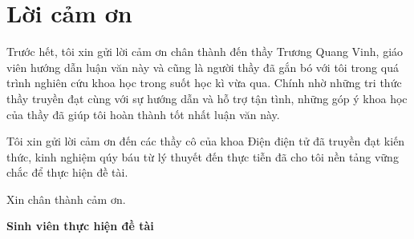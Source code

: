 \chapter*{Lời cảm ơn}
Trước hết, tôi xin gửi lời cảm ơn chân thành đến thầy Trương Quang Vinh,
giáo viên hướng dẫn luận văn này và cũng là người thầy đã gắn bó với tôi trong quá trình nghiên cứu khoa học trong suốt học kì vừa qua.
Chính nhờ những tri thức thầy truyền đạt cùng với sự hướng dẫn và hỗ trợ tận tình, những góp ý khoa học của thầy đã giúp tôi hoàn thành tốt nhất luận văn này.

Tôi xin gửi lời cảm ơn đến các thầy cô của khoa Điện điện tử đã truyền đạt kiến thức,
kinh nghiệm qúy báu từ lý thuyết đến thực tiễn đã cho tôi nền tảng vững chắc để thực hiện đề tài.

Xin chân thành cảm ơn.
\begin{flushright}
\textbf{Sinh viên thực hiện đề tài}
\end{flushright}
